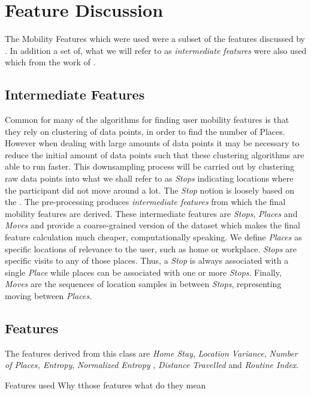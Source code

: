 \section{Feature Discussion}
The Mobility Features which were used were a subset of the features discussed by \cite{Saeb2015,Canzian2015}. In addition a set of, what we will refer to as \textit{intermediate features} were also used which from the work of \cite{sparse-location-2014}. 

\subsection{Intermediate Features}
Common for many of the algorithms for finding user mobility features is that they rely on clustering of data points, in order to find the number of Places. However when dealing with large amounts of data points it may be necessary to reduce the initial amount of data points such that these clustering algorithms are able to run faster. This downsampling process will be carried out by clustering raw data points into what we shall refer to as \textit{Stops} indicating locations where the participant did not move around a lot. The \textit{Stop} notion is loosely based on the \cite{sparse-location-2014}. The pre-processing produces \textit{intermediate features} from which the final mobility features are derived. These intermediate features are \textit{Stops}, \textit{Places} and \textit{Moves} and provide a coarse-grained version of the dataset which makes the final feature calculation much cheaper, computationally speaking. We define \textit{Places} as specific locations of relevance to the user, such as home or workplace. \textit{Stops} are specific visits to any of those places. Thus, a \textit{Stop} is always associated with a single \textit{Place} while places can be associated with one or more \textit{Stops}. Finally, \textit{Moves} are the sequences of location samples in between \textit{Stops}, representing moving between \textit{Places}. 

\subsection{Features}
The features derived from this class are \textit{Home Stay}, \textit{Location Variance}, \textit{Number of Places, Entropy}, \textit{Normalized Entropy} , \textit{Distance Travelled} and \textit{Routine Index}.

Features used
Why tthose features
what do they mean
